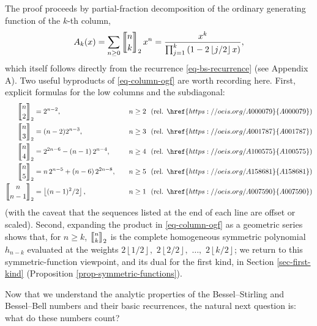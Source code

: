 \documentclass[a4paper]{amsart}
\numberwithin{equation}{section}
\newcommand{\mStirling}[0]{\genfrac{\llbracket}{\rrbracket}{0pt}{}}
\newcommand{\floor}[1]{\left\lfloor #1 \right\rfloor}
\begin{document}
The proof proceeds by partial-fraction decomposition of the ordinary generating function of the $k$-th column,
\begin{equation}\label{eq-column-ogf}
A_k(x) = \sum_{n\ge0} \mStirling{n}{k}_2\, x^n = \frac{x^k}{\prod_{j=1}^k\left(1-2\floor{j/2}x\right)},
\end{equation}
which itself follows directly from the recurrence \eqref{eq-bs-recurrence} (see Appendix A). Two useful byproducts of \eqref{eq-column-ogf} are worth recording here. First, explicit formulas for the low columns and the subdiagonal:
\[
    \begin{aligned}
        \mStirling{n}{2}_2 &= 2^{n-2}, & \quad n \ge 2\ \ (\text{rel. } \href{https://oeis.org/A000079}{A000079})\\
        \mStirling{n}{3}_2 &= (n-2)2^{n-3}, & \quad n \ge 3\ \ (\text{rel. } \href{https://oeis.org/A001787}{A001787})\\
        \mStirling{n}{4}_2 &= 2^{2n-6}-(n-1)\,2^{n-4}, & n\geq 4 \ \ (\text{rel. } \href{https://oeis.org/A100575}{A100575})\\
        \mStirling{n}{5}_2 &= n\,2^{n-5}+(n-6)\, 2^{2n-8}, & n\geq 5 \ \ (\text{rel. } \href{https://oeis.org/A158681}{A158681})\\
        \mStirling{n}{n-1}_2 &= \floor{(n-1)^2/2}, & n \ge 1 \ \ (\text{rel. } \href{https://oeis.org/A007590}{A007590})
    \end{aligned}
\]
(with the caveat that the sequences listed at the end of each line are offset or scaled). Second, expanding the product in \eqref{eq-column-ogf} as a geometric series shows that, for $n \geq k$, $\mStirling{n}{k}_2$ is the complete homogeneous symmetric polynomial $h_{n-k}$ evaluated at the weights $2\floor{1/2},$ $2\floor{2/2},$ $\ldots,$ $2\floor{k/2}$; we return to this symmetric-function viewpoint, and its dual for the first kind, in Section \ref{sec-first-kind} (Proposition \ref{prop-symmetric-functions}).

Now that we understand the analytic properties of the Bessel--Stirling and Bessel--Bell numbers and their basic recurrences, the natural next question is: what do these numbers count?
\end{document}
